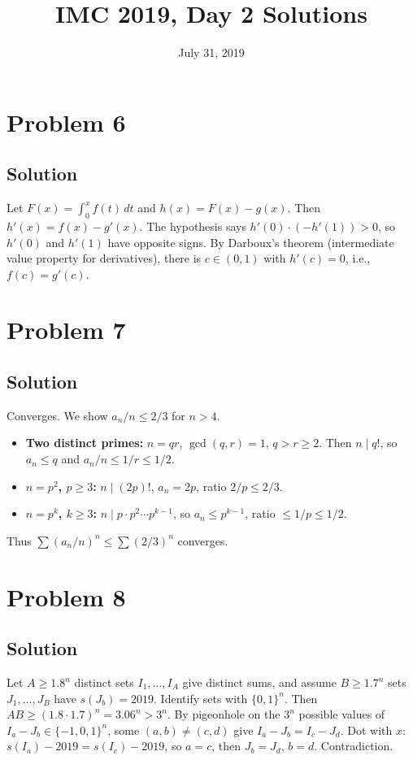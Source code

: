 \documentclass{article}
\title{IMC 2019, Day 2 Solutions}
\date{July 31, 2019}
\begin{document}
\maketitle

\section*{Problem 6}
\subsection*{Solution}
Let $F(x) = \int_0^x f(t)\, dt$ and $h(x) = F(x) - g(x)$. Then $h'(x) = f(x) - g'(x)$. The hypothesis says $h'(0) \cdot (-h'(1)) > 0$, so $h'(0)$ and $h'(1)$ have opposite signs. By Darboux's theorem (intermediate value property for derivatives), there is $c \in (0, 1)$ with $h'(c) = 0$, i.e., $f(c) = g'(c)$.

\section*{Problem 7}
\subsection*{Solution}
Converges. We show $a_n/n \leq 2/3$ for $n > 4$.
\begin{itemize}
\item \textbf{Two distinct primes:} $n = qr$, $\gcd(q,r) = 1$, $q > r \geq 2$. Then $n \mid q!$, so $a_n \leq q$ and $a_n/n \leq 1/r \leq 1/2$.
\item \textbf{$n = p^2$, $p \geq 3$:} $n \mid (2p)!$, $a_n = 2p$, ratio $2/p \leq 2/3$.
\item \textbf{$n = p^k$, $k \geq 3$:} $n \mid p \cdot p^2 \cdots p^{k-1}$, so $a_n \leq p^{k-1}$, ratio $\leq 1/p \leq 1/2$.
\end{itemize}
Thus $\sum (a_n/n)^n \leq \sum (2/3)^n$ converges.

\section*{Problem 8}
\subsection*{Solution}
Let $A \geq 1.8^n$ distinct sets $I_1, \ldots, I_A$ give distinct sums, and assume $B \geq 1.7^n$ sets $J_1, \ldots, J_B$ have $s(J_b) = 2019$. Identify sets with $\{0,1\}^n$. Then $AB \geq (1.8 \cdot 1.7)^n = 3.06^n > 3^n$. By pigeonhole on the $3^n$ possible values of $I_a - J_b \in \{-1, 0, 1\}^n$, some $(a,b) \neq (c,d)$ give $I_a - J_b = I_c - J_d$. Dot with $x$: $s(I_a) - 2019 = s(I_c) - 2019$, so $a = c$, then $J_b = J_d$, $b = d$. Contradiction.
\end{document}
